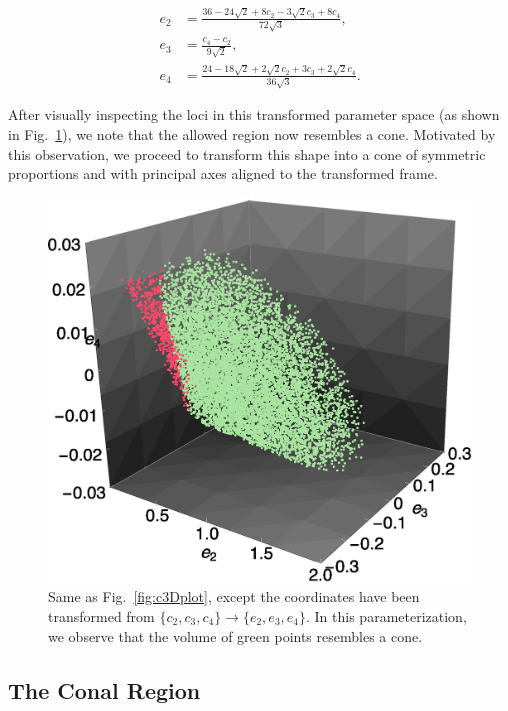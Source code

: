 \begin{align}
e_2 &= \frac{ 36 - 24\sqrt{2} + 8c_2 - 3\sqrt{2}c_3 + 8c_4 }{ 72\sqrt{3} },\\
e_3 &= \frac{ c_4 - c_2 }{ 9\sqrt{2} },\\
e_4 &= \frac{ 24 - 18\sqrt{2} + 2\sqrt{2}c_2 + 3c_3 + 2\sqrt{2}c_4 }{ 36\sqrt{3} }.
\label{eqn:espace}
\end{align}

After visually inspecting the loci in this transformed parameter space (as
shown in Fig.~\ref{fig:e3Dplot}), we note that the allowed region now resembles 
a cone. Motivated by this observation, we proceed to transform this shape into a 
cone of symmetric proportions and with principal axes aligned to the transformed 
frame.

\begin{figure}
\includegraphics[width=\columnwidth]{e3Dplot.eps}
\caption{
Same as Fig.~\ref{fig:c3Dplot}, except the coordinates have been transformed
from $\{c_2,c_3,c_4\}\to\{e_2,e_3,e_4\}$. In this parameterization, we observe
that the volume of green points resembles a cone.
}
\label{fig:e3Dplot}
\end{figure}

\subsection{The Conal Region}

